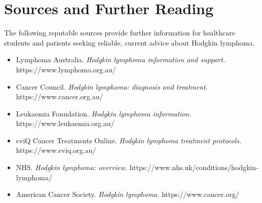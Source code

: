 \section*{Sources and Further Reading}
The following reputable sources provide further information for healthcare students and patients seeking reliable, current advice about Hodgkin lymphoma.

\begin{itemize}
    \item Lymphoma Australia. \textit{Hodgkin lymphoma information and support.} https://www.lymphoma.org.au/
    \item Cancer Council. \textit{Hodgkin lymphoma: diagnosis and treatment.} https://www.cancer.org.au/
    \item Leukaemia Foundation. \textit{Hodgkin lymphoma information.} https://www.leukaemia.org.au/
    \item eviQ Cancer Treatments Online. \textit{Hodgkin lymphoma treatment protocols.} https://www.eviq.org.au/
    \item NHS. \textit{Hodgkin lymphoma: overview.} https://www.nhs.uk/conditions/hodgkin-lymphoma/
    \item American Cancer Society. \textit{Hodgkin lymphoma.} https://www.cancer.org/
\end{itemize}
